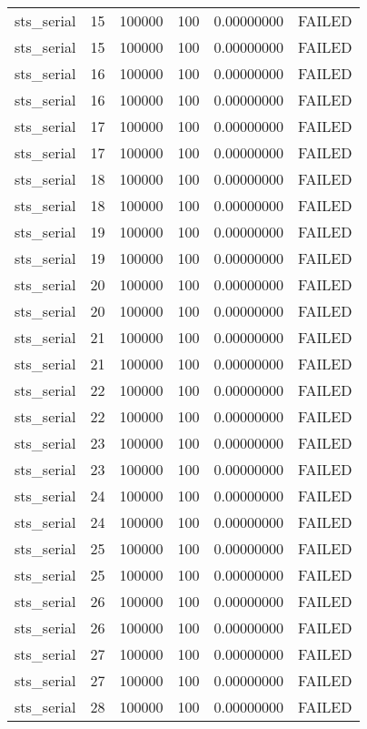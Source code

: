 \begin{longtable}{cccccc}
sts\_serial & 15 & 100000 & 100 & 0.00000000 & FAILED \\
sts\_serial & 15 & 100000 & 100 & 0.00000000 & FAILED \\
sts\_serial & 16 & 100000 & 100 & 0.00000000 & FAILED \\
sts\_serial & 16 & 100000 & 100 & 0.00000000 & FAILED \\
sts\_serial & 17 & 100000 & 100 & 0.00000000 & FAILED \\
sts\_serial & 17 & 100000 & 100 & 0.00000000 & FAILED \\
sts\_serial & 18 & 100000 & 100 & 0.00000000 & FAILED \\
sts\_serial & 18 & 100000 & 100 & 0.00000000 & FAILED \\
sts\_serial & 19 & 100000 & 100 & 0.00000000 & FAILED \\
sts\_serial & 19 & 100000 & 100 & 0.00000000 & FAILED \\
sts\_serial & 20 & 100000 & 100 & 0.00000000 & FAILED \\
sts\_serial & 20 & 100000 & 100 & 0.00000000 & FAILED \\
sts\_serial & 21 & 100000 & 100 & 0.00000000 & FAILED \\
sts\_serial & 21 & 100000 & 100 & 0.00000000 & FAILED \\
sts\_serial & 22 & 100000 & 100 & 0.00000000 & FAILED \\
sts\_serial & 22 & 100000 & 100 & 0.00000000 & FAILED \\
sts\_serial & 23 & 100000 & 100 & 0.00000000 & FAILED \\
sts\_serial & 23 & 100000 & 100 & 0.00000000 & FAILED \\
sts\_serial & 24 & 100000 & 100 & 0.00000000 & FAILED \\
sts\_serial & 24 & 100000 & 100 & 0.00000000 & FAILED \\
sts\_serial & 25 & 100000 & 100 & 0.00000000 & FAILED \\
sts\_serial & 25 & 100000 & 100 & 0.00000000 & FAILED \\
sts\_serial & 26 & 100000 & 100 & 0.00000000 & FAILED \\
sts\_serial & 26 & 100000 & 100 & 0.00000000 & FAILED \\
sts\_serial & 27 & 100000 & 100 & 0.00000000 & FAILED \\
sts\_serial & 27 & 100000 & 100 & 0.00000000 & FAILED \\
sts\_serial & 28 & 100000 & 100 & 0.00000000 & FAILED \\

\end{longtable}
